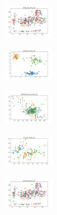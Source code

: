 \begin{figure}[H]
    \hfill
    \begin{subfigure}
        \centering
        \includegraphics[width=0.234\textwidth]{img/hs-ls/ecoli_set_const_10_589741062_clust.png}
    \end{subfigure}
    \hfill
    \begin{subfigure}
        \centering
        \includegraphics[width=0.234\textwidth]{img/hs-ls/rand_set_const_10_589741062_clust.png}
    \end{subfigure}
    \hfill
    \begin{subfigure}
        \centering
        \includegraphics[width=0.234\textwidth]{img/hs-ls/newthyroid_set_const_10_589741062_clust.png}
    \end{subfigure}
    \hfill
    \begin{subfigure}
        \centering
        \includegraphics[width=0.234\textwidth]{img/hs-ls/iris_set_const_10_277451237_clust.png}
    \end{subfigure}
    \hfill
    \begin{subfigure}
        \centering
        \includegraphics[width=0.234\textwidth]{img/hs-ls/ecoli_set_const_10_277451237_clust.png}
    \end{subfigure}
    \hfill
    \begin{subfigure}

\end{subfigure}
\end{figure}
